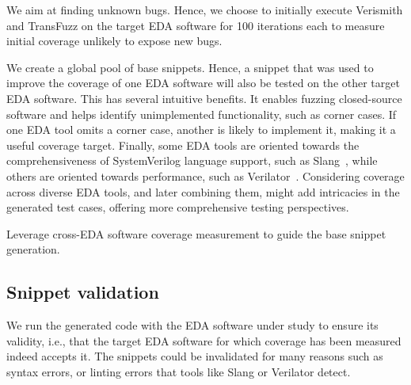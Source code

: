We aim at finding unknown bugs.
Hence, we choose to initially execute Verismith and TransFuzz on the target EDA software for 100 iterations each to measure initial coverage unlikely to expose new bugs.

We create a global pool of base snippets.
Hence, a snippet that was used to improve the coverage of one EDA software will also be tested on the other target EDA software.
This has several intuitive benefits.
It enables fuzzing closed-source software and helps identify unimplemented functionality, such as corner cases.
If one EDA tool omits a corner case, another is likely to implement it, making it a useful coverage target.
Finally, some EDA tools are oriented towards the comprehensiveness of SystemVerilog language support, such as Slang~\cite{popoloski2019slang}, while others are oriented towards performance, such as Verilator~\cite{Snyder2024Verilator}.
Considering coverage across diverse EDA tools, and later combining them, might add intricacies in the generated test cases, offering more comprehensive testing perspectives.

\begin{newdesignprinciple}
    Leverage cross-EDA software coverage measurement to guide the base snippet generation.
\end{newdesignprinciple}

\subsection{Snippet validation}
\label{sec:codegen:short-snippet-validation}

We run the generated code with the EDA software under study to ensure its validity, i.e., that the target EDA software for which coverage has been measured indeed accepts it.
The snippets could be invalidated for many reasons such as syntax errors,
or linting errors that tools like Slang or Verilator detect.

